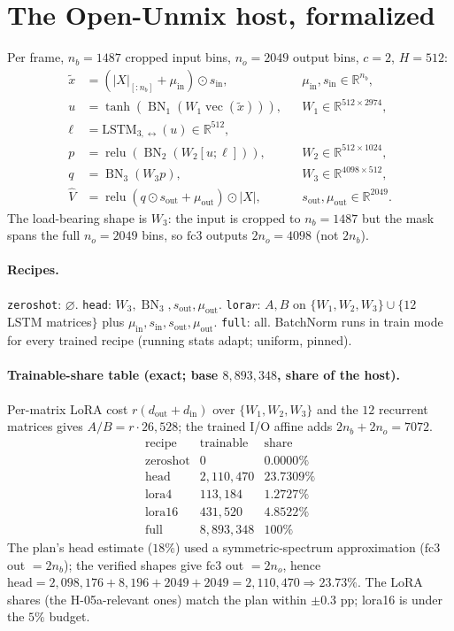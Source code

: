 \documentclass[11pt]{article}
\newcommand{\code}[1]{\texttt{#1}}
\newcommand{\vecop}{\operatorname{vec}}
\DeclareMathOperator{\relu}{relu}
\DeclareMathOperator{\BN}{BN}
\begin{document}
\section{The Open-Unmix host, formalized}
Per frame, $n_b=1487$ cropped input bins, $n_o=2049$ output bins, $c=2$, $H=512$:
\[
\begin{aligned}
\tilde x&=(|X|_{[:n_b]}+\mu_{\text{in}})\odot s_{\text{in}}, &&\mu_{\text{in}},s_{\text{in}}\in\mathbb R^{n_b},\\
u&=\tanh(\BN_1(W_1\vecop(\tilde x))), &&W_1\in\mathbb R^{512\times2974},\\
\ell&=\mathrm{LSTM}_{3,\leftrightarrow}(u)\in\mathbb R^{512},\\
p&=\relu(\BN_2(W_2[u;\ell])), &&W_2\in\mathbb R^{512\times1024},\\
q&=\BN_3(W_3 p), &&W_3\in\mathbb R^{4098\times512},\\
\widehat V&=\relu(q\odot s_{\text{out}}+\mu_{\text{out}})\odot|X|, &&s_{\text{out}},\mu_{\text{out}}\in\mathbb R^{2049}.
\end{aligned}
\]
The load-bearing shape is $W_3$: the input is cropped to $n_b=1487$ but the mask spans the
full $n_o=2049$ bins, so $\mathrm{fc3}$ outputs $2n_o=4098$ (not $2n_b$).

\paragraph{Recipes.} \code{zeroshot}: $\varnothing$. \code{head}: $W_3,\BN_3,s_{\text{out}},\mu_{\text{out}}$.
\code{lora}$r$: $A,B$ on $\{W_1,W_2,W_3\}\cup\{12$ LSTM matrices$\}$ plus
$\mu_{\text{in}},s_{\text{in}},s_{\text{out}},\mu_{\text{out}}$. \code{full}: all. BatchNorm
runs in train mode for every trained recipe (running stats adapt; uniform, pinned).

\paragraph{Trainable-share table (exact; base $8{,}893{,}348$, share of the host).}
Per-matrix LoRA cost $r(d_{\text{out}}+d_{\text{in}})$ over $\{W_1,W_2,W_3\}$ and the $12$
recurrent matrices gives $A/B=r\cdot26{,}528$; the trained I/O affine adds $2n_b+2n_o=7072$.
\[
\begin{array}{lrr}
\text{recipe} & \text{trainable} & \text{share}\\\hline
\text{zeroshot} & 0 & 0.0000\%\\
\text{head} & 2{,}110{,}470 & 23.7309\%\\
\text{lora4} & 113{,}184 & 1.2727\%\\
\text{lora16} & 431{,}520 & 4.8522\%\\
\text{full} & 8{,}893{,}348 & 100\%
\end{array}
\]
The plan's head estimate ($18\%$) used a symmetric-spectrum approximation ($\mathrm{fc3}$ out
$=2n_b$); the verified shapes give $\mathrm{fc3}$ out $=2n_o$, hence
$\text{head}=2{,}098{,}176+8{,}196+2049+2049=2{,}110{,}470\Rightarrow23.73\%$. The LoRA shares
(the H-05a-relevant ones) match the plan within $\pm0.3$ pp; lora16 is under the $5\%$ budget.
\end{document}
